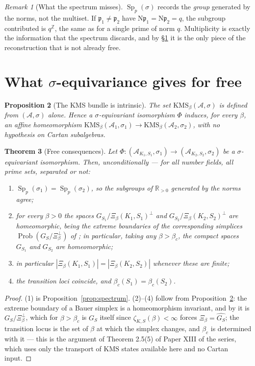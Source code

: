 \documentclass[11pt]{amsart}
\numberwithin{equation}{section}
\newtheorem{theorem}{Theorem}[section]
\newtheorem{proposition}[theorem]{Proposition}
\theoremstyle{definition}
\theoremstyle{remark}
\newtheorem{remark}[theorem]{Remark}
\newcommand{\Z}{\mathbb{Z}}
\newcommand{\R}{\mathbb{R}}
\newcommand{\cA}{\mathcal{A}}
\newcommand{\pp}{\mathfrak{p}}
\newcommand{\Ns}{\mathrm{N}}
\newcommand{\Prob}{\operatorname{Prob}}
\newcommand{\Sp}{\operatorname{Sp}}
\begin{document}
\begin{remark}[What the spectrum misses]\label{rem:missing}
$\Sp_p(\sigma)$ records the \emph{group} generated by the norms, not the multiset. If
$\pp_1\ne\pp_2$ have $\Ns\pp_1=\Ns\pp_2=q$, the subgroup contributed is $q^\Z$, the same as
for a single prime of norm $q$. Multiplicity is exactly the information that the spectrum
discards, and by \S\ref{sec:free} it is the only piece of the reconstruction that is not
already free.
\end{remark}

\section{What $\sigma$-equivariance gives for free}\label{sec:free}

\begin{proposition}[The KMS bundle is intrinsic]\label{prop:kmsintrinsic}
The set $\mathrm{KMS}_\beta(\cA,\sigma)$ is defined from $(\cA,\sigma)$ alone. Hence a
$\sigma$-equivariant isomorphism $\Phi$ induces, for every $\beta$, an affine homeomorphism
$\mathrm{KMS}_\beta(\cA_1,\sigma_1)\to\mathrm{KMS}_\beta(\cA_2,\sigma_2)$, with no hypothesis
on Cartan subalgebras.
\end{proposition}

\begin{theorem}[Free consequences]\label{thm:free}
Let $\Phi:(\cA_{K_1,S_1},\sigma_1)\to(\cA_{K_2,S_2},\sigma_2)$ be a $\sigma$-equivariant
isomorphism. Then, unconditionally --- for all number fields, all prime sets, separated or
not:
\begin{enumerate}
\item $\Sp_p(\sigma_1)=\Sp_p(\sigma_2)$, so the subgroups of $\R_{>0}$ generated by the norms
agree;
\item for every $\beta>0$ the spaces $G_{S_1}/\Xi_\beta(K_1,S_1)^\perp$ and
$G_{S_2}/\Xi_\beta(K_2,S_2)^\perp$ are homeomorphic, being the extreme boundaries of the
corresponding simplices $\Prob(G_S/\Xi_\beta^\perp)$ of \cite[Thm.~3.6]{Main}; in particular,
taking any $\beta>\beta_c$, the compact spaces $G_{S_1}$ and $G_{S_2}$ are homeomorphic;
\item in particular $|\Xi_\beta(K_1,S_1)|=|\Xi_\beta(K_2,S_2)|$ whenever these are finite;
\item the transition loci coincide, and $\beta_c(S_1)=\beta_c(S_2)$.
\end{enumerate}
\end{theorem}

\begin{proof}
(1) is Proposition~\ref{prop:spectrum}. (2)--(4) follow from
Proposition~\ref{prop:kmsintrinsic}: the extreme boundary of a Bauer simplex is a
homeomorphism invariant, and by \cite[Thm.~3.6]{Main} it is $G_S/\Xi_\beta^\perp$, which for
$\beta>\beta_c$ is $G_S$ itself since $\zeta_{K,S}(\beta)<\infty$ forces
$\Xi_\beta=\widehat{G_S}$; the transition locus is the set of $\beta$ at which the simplex
changes, and $\beta_c$ is determined with it --- this is the argument of Theorem 2.5(5) of
Paper XIII of the series, which uses only the transport of $\mathrm{KMS}$ states available
here and no Cartan input.
\end{proof}
\end{document}
